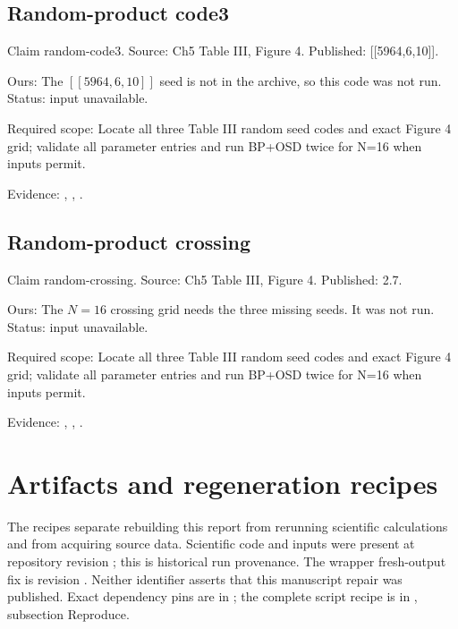 \subsection{Random-product code3}\label{claim:random-code3}
Claim random-code3. Source: Ch5 Table III, Figure 4. Published: [[5964,6,10]].

Ours: The $[[5964,6,10]]$ seed is not in the archive, so this code was not run. Status: input unavailable.

Required scope: Locate all three Table III random seed codes and exact Figure 4 grid; validate all parameter entries and run BP+OSD twice for N=16 when inputs permit.

Evidence: \href{https://github.com/alectionary/vibe-math/blob/master/formalization/quintavalle-hgp/sources/browser-extraction.txt}{}, \href{https://github.com/alectionary/vibe-math/blob/master/formalization/quintavalle-hgp/availability.md}{}, \href{https://github.com/alectionary/vibe-math/blob/master/formalization/quintavalle-hgp/results/original_pilots.json}{}.
\subsection{Random-product crossing}\label{claim:random-crossing}
Claim random-crossing. Source: Ch5 Table III, Figure 4. Published: 2.7.

Ours: The $N=16$ crossing grid needs the three missing seeds. It was not run. Status: input unavailable.

Required scope: Locate all three Table III random seed codes and exact Figure 4 grid; validate all parameter entries and run BP+OSD twice for N=16 when inputs permit.

Evidence: \href{https://github.com/alectionary/vibe-math/blob/master/formalization/quintavalle-hgp/sources/browser-extraction.txt}{}, \href{https://github.com/alectionary/vibe-math/blob/master/formalization/quintavalle-hgp/availability.md}{}, \href{https://github.com/alectionary/vibe-math/blob/master/formalization/quintavalle-hgp/results/original_pilots.json}{}.

\section{Artifacts and regeneration recipes}
The recipes separate rebuilding this report from rerunning scientific calculations and from acquiring source data. Scientific code and inputs were present at repository revision ; this is historical run provenance. The wrapper fresh-output fix is revision . Neither identifier asserts that this manuscript repair was published. Exact dependency pins are in \href{https://github.com/alectionary/vibe-math/blob/master/formalization/quintavalle-hgp/requirements.txt}{}; the complete script recipe is in \href{https://github.com/alectionary/vibe-math/blob/master/formalization/quintavalle-hgp/README.md#reproduce}{}, subsection Reproduce.


